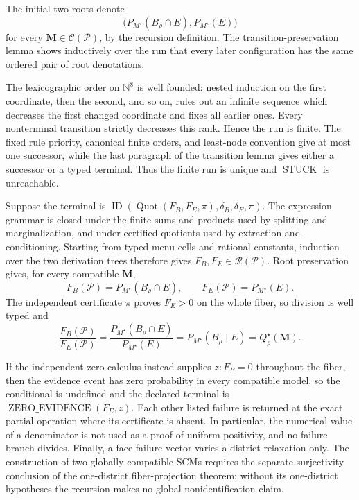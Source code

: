 The initial two roots denote
\[
 \bigl(P_{M^\star}(B_\rho\cap E),P_{M^\star}(E)\bigr)
\]
for every \(\mathbf M\in\mathcal C(\mathcal P)\), by the recursion definition.  The transition-preservation lemma shows inductively over the run that every later configuration has the same ordered pair of root denotations.

The lexicographic order on \(\mathbb N^8\) is well founded: nested induction on the first coordinate, then the second, and so on, rules out an infinite sequence which decreases the first changed coordinate and fixes all earlier ones.  Every nonterminal transition strictly decreases this rank.  Hence the run is finite.  The fixed rule priority, canonical finite orders, and least-node convention give at most one successor, while the last paragraph of the transition lemma gives either a successor or a typed terminal.  Thus the finite run is unique and \(\operatorname{STUCK}\) is unreachable.

Suppose the terminal is
\(
 \operatorname{ID}(\operatorname{Quot}(F_B,F_E,\pi),\delta_B,\delta_E,\pi).
\)
The expression grammar is closed under the finite sums and products used by splitting and marginalization, and under certified quotients used by extraction and conditioning.  Starting from typed-menu cells and rational constants, induction over the two derivation trees therefore gives
\(
 F_B,F_E\in\mathscr R(\mathcal P).
\)
Root preservation gives, for every compatible \(\mathbf M\),
\[
 F_B(\mathcal P)=P_{M^\star}(B_\rho\cap E),
 \qquad
 F_E(\mathcal P)=P_{M^\star}(E).
\]
The independent certificate \(\pi\) proves \(F_E>0\) on the whole fiber, so division is well typed and
\[
 \frac{F_B(\mathcal P)}{F_E(\mathcal P)}
 =\frac{P_{M^\star}(B_\rho\cap E)}{P_{M^\star}(E)}
 =P_{M^\star}(B_\rho\mid E)
 =Q_\rho^\star(\mathbf M).
\]

If the independent zero calculus instead supplies \(z:F_E=0\) throughout the fiber, then the evidence event has zero probability in every compatible model, so the conditional is undefined and the declared terminal is \(\operatorname{ZERO\_EVIDENCE}(F_E,z)\).  Each other listed failure is returned at the exact partial operation where its certificate is absent.  In particular, the numerical value of a denominator is not used as a proof of uniform positivity, and no failure branch divides.  Finally, a face-failure vector varies a district relaxation only.  The construction of two globally compatible SCMs requires the separate surjectivity conclusion of the one-district fiber-projection theorem; without its one-district hypotheses the recursion makes no global nonidentification claim.